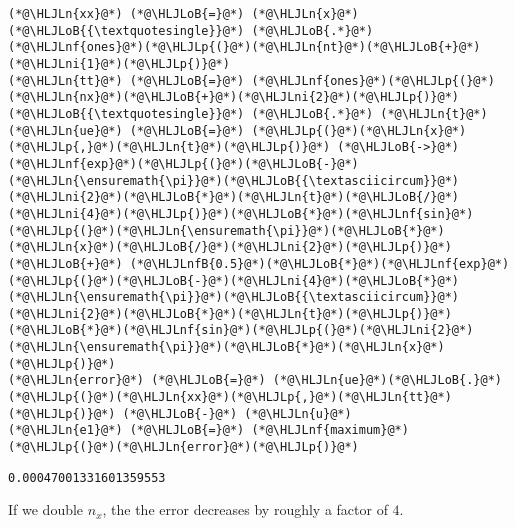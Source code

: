 \documentclass[12pt,landscape]{article}
\newcommand{\HLJLn}[1]{#1}
\newcommand{\HLJLnf}[1]{\textcolor[RGB]{66,102,213}{#1}}
\newcommand{\HLJLnfB}[1]{\textcolor[RGB]{59,151,46}{#1}}
\newcommand{\HLJLni}[1]{\textcolor[RGB]{59,151,46}{#1}}
\newcommand{\HLJLoB}[1]{\textcolor[RGB]{102,102,102}{\textbf{#1}}}
\newcommand{\HLJLp}[1]{#1}
\begin{document}
{\begin{lstlisting}
(*@\HLJLn{xx}@*) (*@\HLJLoB{=}@*) (*@\HLJLn{x}@*)(*@\HLJLoB{{\textquotesingle}}@*) (*@\HLJLoB{.*}@*) (*@\HLJLnf{ones}@*)(*@\HLJLp{(}@*)(*@\HLJLn{nt}@*)(*@\HLJLoB{+}@*)(*@\HLJLni{1}@*)(*@\HLJLp{)}@*)
(*@\HLJLn{tt}@*) (*@\HLJLoB{=}@*) (*@\HLJLnf{ones}@*)(*@\HLJLp{(}@*)(*@\HLJLn{nx}@*)(*@\HLJLoB{+}@*)(*@\HLJLni{2}@*)(*@\HLJLp{)}@*)(*@\HLJLoB{{\textquotesingle}}@*) (*@\HLJLoB{.*}@*) (*@\HLJLn{t}@*)
(*@\HLJLn{ue}@*) (*@\HLJLoB{=}@*) (*@\HLJLp{(}@*)(*@\HLJLn{x}@*)(*@\HLJLp{,}@*)(*@\HLJLn{t}@*)(*@\HLJLp{)}@*) (*@\HLJLoB{->}@*) (*@\HLJLnf{exp}@*)(*@\HLJLp{(}@*)(*@\HLJLoB{-}@*)(*@\HLJLn{\ensuremath{\pi}}@*)(*@\HLJLoB{{\textasciicircum}}@*)(*@\HLJLni{2}@*)(*@\HLJLoB{*}@*)(*@\HLJLn{t}@*)(*@\HLJLoB{/}@*)(*@\HLJLni{4}@*)(*@\HLJLp{)}@*)(*@\HLJLoB{*}@*)(*@\HLJLnf{sin}@*)(*@\HLJLp{(}@*)(*@\HLJLn{\ensuremath{\pi}}@*)(*@\HLJLoB{*}@*)(*@\HLJLn{x}@*)(*@\HLJLoB{/}@*)(*@\HLJLni{2}@*)(*@\HLJLp{)}@*) (*@\HLJLoB{+}@*) (*@\HLJLnfB{0.5}@*)(*@\HLJLoB{*}@*)(*@\HLJLnf{exp}@*)(*@\HLJLp{(}@*)(*@\HLJLoB{-}@*)(*@\HLJLni{4}@*)(*@\HLJLoB{*}@*)(*@\HLJLn{\ensuremath{\pi}}@*)(*@\HLJLoB{{\textasciicircum}}@*)(*@\HLJLni{2}@*)(*@\HLJLoB{*}@*)(*@\HLJLn{t}@*)(*@\HLJLp{)}@*)(*@\HLJLoB{*}@*)(*@\HLJLnf{sin}@*)(*@\HLJLp{(}@*)(*@\HLJLni{2}@*)(*@\HLJLn{\ensuremath{\pi}}@*)(*@\HLJLoB{*}@*)(*@\HLJLn{x}@*)(*@\HLJLp{)}@*)
(*@\HLJLn{error}@*) (*@\HLJLoB{=}@*) (*@\HLJLn{ue}@*)(*@\HLJLoB{.}@*)(*@\HLJLp{(}@*)(*@\HLJLn{xx}@*)(*@\HLJLp{,}@*)(*@\HLJLn{tt}@*)(*@\HLJLp{)}@*) (*@\HLJLoB{-}@*) (*@\HLJLn{u}@*) 
(*@\HLJLn{e1}@*) (*@\HLJLoB{=}@*) (*@\HLJLnf{maximum}@*)(*@\HLJLp{(}@*)(*@\HLJLn{error}@*)(*@\HLJLp{)}@*)
\end{lstlisting}

\begin{lstlisting}
0.00047001331601359553
\end{lstlisting}


If we double $n_x$, the the error decreases by roughly a factor of $4$.


}
\end{document}
